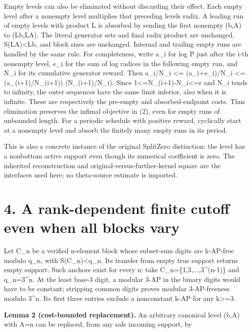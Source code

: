 Empty levels can also be eliminated without discarding their effect. Each empty level after a nonempty level multiplies that preceding level\textquotesingle s radix. A leading run of empty levels with product L is absorbed by sending the first nonempty (b,A) to (Lb,LA). The literal generator sets and final radix product are unchanged, S(LA)\textless Lb, and block sizes are unchanged. Internal and trailing empty runs are handled by the same rule. For completeness, write a\_i for log P just after the i-th nonempty level, e\_i for the sum of log radices in the following empty run, and N\_i for its cumulative generator reward. Then a\_i/N\_i \textless= (a\_i+e\_i)/N\_i \textless= (a\_(i+1)/N\_(i+1)) (N\_(i+1)/N\_i). Since 1\textless=N\_(i+1)-N\_i\textless=r and N\_i tends to infinity, the outer sequences have the same limit inferior, also when it is infinite. These are respectively the pre-empty and absorbed-endpoint costs. Thus elimination preserves the infimal objective in (2), even for empty runs of unbounded length. For a periodic schedule with positive reward, cyclically start at a nonempty level and absorb the finitely many empty runs in its period.

This is also a concrete instance of the original SplitZero distinction: the level has a nonbottom active support even though its numerical coefficient is zero. The inherited reconstruction and original-versus-further-kernel square are the interfaces used here; no theta-source estimate is imported.

\section{4. A rank-dependent finite cutoff even when all blocks vary}\label{n07-a-rank-dependent-finite-cutoff-even-when-all-blocks-vary}

Let C\_n be a verified n-element block whose subset-sum digits are k-AP-free modulo q\_n, with S(C\_n)\textless q\_n. Its transfer from empty true support returns empty support. Such anchors exist for every n: take C\_n=\{1,3,...,3\^{}(n-1)\} and q\_n=3\^{}n. At the least base-3 digit, a modular 3-AP in the binary digits would have to be constant; stripping common digits proves modular 3-AP-freeness modulo 3\^{}n. Its first three entries exclude a nonconstant k-AP for any k\textgreater=3.

\textbf{Lemma 2 (cost-bounded replacement).} An arbitrary canonical level (b,A) with \textbar A\textbar=n can be replaced, from any safe incoming support, by

